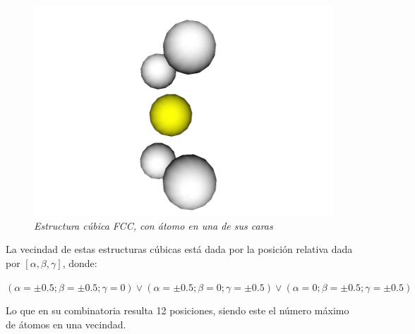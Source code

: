 \begin{figure}[H]
  \centering
  \includegraphics[scale=.3]{images/FCC-diagonal}
  \caption{\em Estructura cúbica FCC, con átomo en una de sus caras}
\end{figure}

La vecindad de estas estructuras cúbicas está dada por la posición relativa dada por $[\alpha, \beta, \gamma]$, donde:

$ (\alpha = \pm 0.5; \beta = \pm 0.5; \gamma = 0) \vee (\alpha = \pm 0.5; \beta = 0; \gamma = \pm 0.5) \vee (\alpha = 0; \beta = \pm 0.5; \gamma = \pm 0.5)$

Lo que en su combinatoria resulta 12 posiciones, siendo este el número máximo de átomos en una vecindad.

